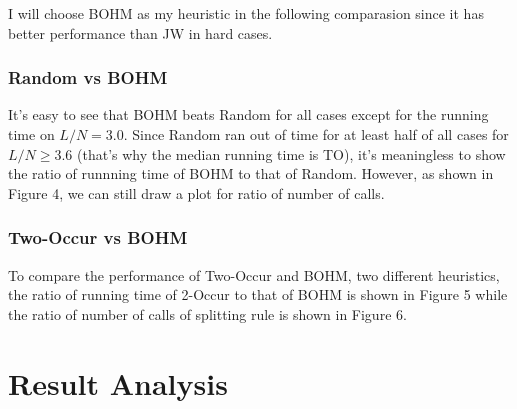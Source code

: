 \documentclass[12pt]{article}
\begin{document}
	\begin{center}
		\begin{table}[th!]
	\caption{Number of calls to splitting rule and $L/N$}
	\end{table}
	\end{center}

	I will choose BOHM as my heuristic in the following comparasion since it has better performance than JW in hard cases. 
	\subsubsection{Random vs BOHM}
	It's easy to see that BOHM beats Random for  all cases except for the running time on $L/N=3.0$. Since Random ran out of time for at least half of all cases for $L/N\ge3.6$ (that's why the median running time is TO), it's meaningless to show the ratio of runnning time of BOHM to that of Random. However, as shown in Figure 4, we can still draw a plot for ratio of number of calls.

	\subsubsection{Two-Occur vs BOHM}
	To compare the performance of Two-Occur and BOHM, two different heuristics, the ratio of running time of 2-Occur to that of BOHM  is shown in Figure 5 while the ratio of number of calls of splitting rule is shown in Figure 6. 

	\section{Result Analysis}
\end{document}
